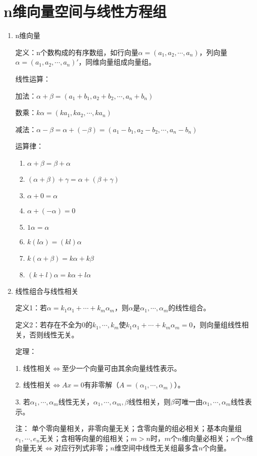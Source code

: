 \documentclass[UTF8]{ctexart}
\theoremstyle{remark}
\begin{document}
\section{n维向量空间与线性方程组  }
\begin{enumerate}


\item n维向量  

定义：n个数构成的有序数组，如行向量\(\alpha=(a_1,a_2,\cdots,a_n)\)，列向量\(\alpha=(a_1,a_2,\cdots,a_n)'\)，同维向量组成向量组。  

线性运算：  

加法：\(\alpha+\beta=(a_1+b_1,a_2+b_2,\cdots,a_n+b_n)\)  

数乘：\(k\alpha=(ka_1,ka_2,\cdots,ka_n)\)  

减法：\(\alpha-\beta=\alpha+(-\beta)=(a_1-b_1,a_2-b_2,\cdots,a_n-b_n)\)  

运算律：  
\begin{enumerate}
\item \(\alpha+\beta=\beta+\alpha\)  
\item \((\alpha+\beta)+\gamma=\alpha+(\beta+\gamma)\)  
\item \(\alpha+0=\alpha\)  
\item \(\alpha+(-\alpha)=0\)  
\item \(1\alpha=\alpha\)  
\item \(k(l\alpha)=(kl)\alpha\)  
\item \(k(\alpha+\beta)=k\alpha+k\beta\)  
\item \((k+l)\alpha=k\alpha+l\alpha\)  
\end{enumerate}
\item 线性组合与线性相关  

定义1：若\(\alpha=k_1\alpha_1+\cdots+k_m\alpha_m\)，则\(\alpha\)是\(\alpha_1,\cdots,\alpha_m\)的线性组合。  

定义2：若存在不全为0的\(k_1,\cdots,k_m\)使\(k_1\alpha_1+\cdots+k_m\alpha_m=0\)，则向量组线性相关，否则线性无关。  

定理：  

1. 线性相关\(\Leftrightarrow\)至少一个向量可由其余向量线性表示。  

2. 线性相关\(\Leftrightarrow Ax=0\)有非零解（\(A=(\alpha_1,\cdots,\alpha_m)\)）。  

3. 若\(\alpha_1,\cdots,\alpha_m\)线性无关，\(\alpha_1,\cdots,\alpha_m,\beta\)线性相关，则\(\beta\)可唯一由\(\alpha_1,\cdots,\alpha_m\)线性表示。  

注：  
单个零向量相关，非零向量无关；含零向量的组必相关；基本向量组\(e_1,\cdots,e_n\)无关；含相等向量的组相关；\(m>n\)时，\(m\)个\(n\)维向量必相关；\(n\)个\(n\)维向量无关\(\Leftrightarrow\)对应行列式非零；\(n\)维空间中线性无关组最多含\(n\)个向量。  


\end{enumerate}
\end{document}
